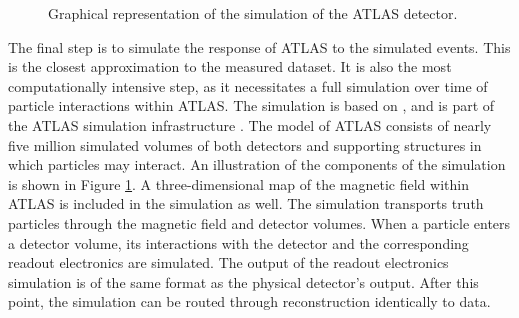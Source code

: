 \begin{figure}[h!]
\captionsetup[subfigure]{position=b}
\centering
{}
\caption{Graphical representation of the \geant simulation of the ATLAS detector.}
\label{fig:atlasGeantSim}
\end{figure}

The final step is to simulate the response of ATLAS to the simulated events.
This is the closest approximation to the measured dataset.
It is also the most computationally intensive step, as it necessitates a full simulation over time of particle interactions within ATLAS.
The simulation is based on \geant \cite{geant}, and is part of the ATLAS simulation infrastructure \cite{SOFT-2010-01}.
The \geant model of ATLAS consists of nearly five million simulated volumes of both detectors and supporting structures in which particles may interact.
An illustration of the components of the simulation is shown in Figure \ref{fig:atlasGeantSim}.
A three-dimensional map of the magnetic field within ATLAS is included in the simulation as well.
The simulation transports truth particles through the magnetic field and detector volumes.
When a particle enters a detector volume, its interactions with the detector and the corresponding readout electronics are simulated.
The output of the readout electronics simulation is of the same format as the physical detector's output.
After this point, the simulation can be routed through reconstruction identically to data.

